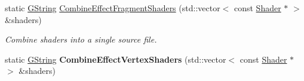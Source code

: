 \begin{DoxyCompactItemize}
\mbox{\label{classrev_1_1_shader_aed2e531d170068913c4eab430abaeb3d}} 
static \mbox{\hyperlink{classrev_1_1_g_string}{G\+String}} \mbox{\hyperlink{classrev_1_1_shader_aed2e531d170068913c4eab430abaeb3d}{Combine\+Effect\+Fragment\+Shaders}} (std\+::vector$<$ const \mbox{\hyperlink{classrev_1_1_shader}{Shader}} $\ast$ $>$ \&shaders)
\begin{DoxyCompactList}\small\item\em Combine shaders into a single source file. \end{DoxyCompactList}\item 
\mbox{\label{classrev_1_1_shader_ab086016ba59768034069ea4cb8dd0be0}} 
static \mbox{\hyperlink{classrev_1_1_g_string}{G\+String}} {\bfseries Combine\+Effect\+Vertex\+Shaders} (std\+::vector$<$ const \mbox{\hyperlink{classrev_1_1_shader}{Shader}} $\ast$ $>$ \&shaders)
\end{DoxyCompactItemize}
